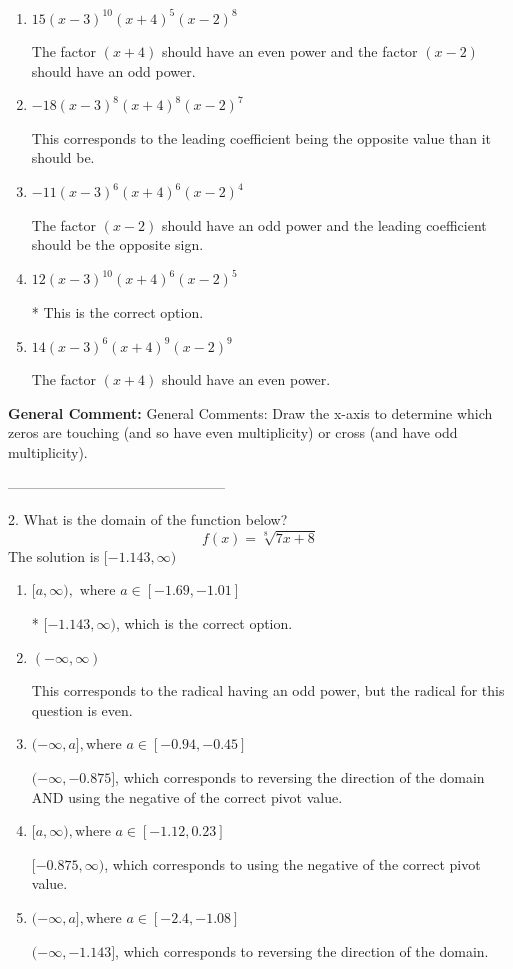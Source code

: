 \documentclass{extbook}[14pt]
\begin{document}
\begin{enumerate}[label=\Alph*.] 
\item $ 15(x - 3)^{10} (x + 4)^{5} (x - 2)^{8} $ 

 The factor $(x + 4)$ should have an even power and the factor $(x - 2)$ should have an odd power. 
\item $ -18(x - 3)^{8} (x + 4)^{8} (x - 2)^{7} $ 

 This corresponds to the leading coefficient being the opposite value than it should be. 
\item $ -11(x - 3)^{6} (x + 4)^{6} (x - 2)^{4} $ 

 The factor $(x - 2)$ should have an odd power and the leading coefficient should be the opposite sign. 
\item $ 12(x - 3)^{10} (x + 4)^{6} (x - 2)^{5} $ 

 * This is the correct option. 
\item $ 14(x - 3)^{6} (x + 4)^{9} (x - 2)^{9} $ 

 The factor $(x + 4)$ should have an even power. 
\end{enumerate} 
 
\textbf{General Comment:} General Comments: Draw the x-axis to determine which zeros are touching (and so have even multiplicity) or cross (and have odd multiplicity). 

-----------------------------------------------

2. What is the domain of the function below?
\[ f(x) = \sqrt[8]{7 x + 8} \] 
The solution is $ [-1.143, \infty) $ 

\begin{enumerate}[label=\Alph*.] 
\item $ [a, \infty), \text{ where } a \in [-1.69, -1.01] $ 

 * $[-1.143, \infty)$, which is the correct option. 
\item $ (-\infty, \infty) $ 

 This corresponds to the radical having an odd power, but the radical for this question is even. 
\item $ (-\infty, a], \text{where } a \in [-0.94, -0.45] $ 

 $(-\infty, -0.875]$, which corresponds to reversing the direction of the domain AND using the negative of the correct pivot value. 
\item $ [a, \infty), \text{where } a \in [-1.12, 0.23] $ 

 $[-0.875, \infty)$, which corresponds to using the negative of the correct pivot value. 
\item $ (-\infty, a], \text{where } a \in [-2.4, -1.08] $ 

  $(-\infty, -1.143]$, which corresponds to reversing the direction of the domain. 
\end{enumerate} 
 
\end{document}
